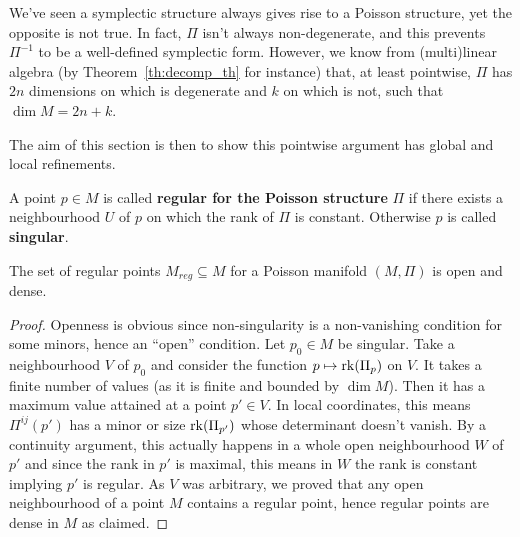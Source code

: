 \documentclass[main.tex]{subfiles}
\begin{document}
We've seen a symplectic structure always gives rise to a Poisson structure, yet the opposite is not true. In fact, $\Pi$ isn't always non-degenerate, and this prevents $\Pi^{-1}$ to be a well-defined symplectic form. However, we know from (multi)linear algebra (by Theorem~\ref{th:decomp_th} for instance) that, at least pointwise, $\Pi$ has $2n$ dimensions on which is degenerate and $k$ on which is not, such that $\dim M = 2n+k$.

The aim of this section is then to show this pointwise argument has global and local refinements.

\begin{definition}
	A point $p \in M$ is called \textbf{regular for the Poisson structure} $\Pi$ if there exists a neighbourhood $U$ of $p$ on which the rank of $\Pi$ is constant. Otherwise $p$ is called \textbf{singular}.
\end{definition}

\begin{lemma}
	The set of regular points $M_{reg} \subseteq M$ for a Poisson manifold $(M, \Pi)$ is open and dense.
\end{lemma}
\begin{proof}
	Openness is obvious since non-singularity is a non-vanishing condition for some minors, hence an ``open'' condition. Let $p_0 \in M$ be singular. Take a neighbourhood $V$ of $p_0$ and consider the function $p \mapsto \operatorname{rk}(\Pi_p)$ on $V$. It takes a finite number of values (as it is finite and bounded by $\dim M$). Then it has a maximum value attained at a point $p' \in V$. In local coordinates, this means $\Pi^{ij}(p')$ has a minor or size $\operatorname{rk}(\Pi_{p'})$ whose determinant doesn't vanish. By a continuity argument, this actually happens in a whole open neighbourhood $W$ of $p'$ and since the rank in $p'$ is maximal, this means in $W$ the rank is constant implying $p'$ is regular. As $V$ was arbitrary, we proved that any open neighbourhood of a point $M$ contains a regular point, hence regular points are dense in $M$ as claimed.
\end{proof}
\end{document}
